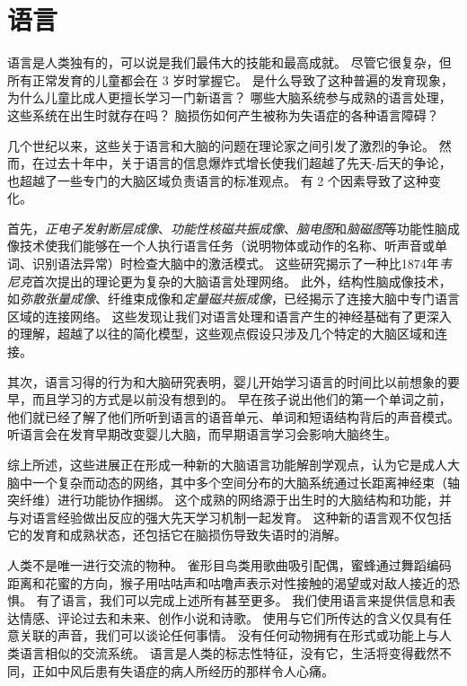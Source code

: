 \chapter{语言} \label{chap:chap55}

语言是人类独有的，可以说是我们最伟大的技能和最高成就。
尽管它很复杂，但所有正常发育的儿童都会在 3 岁时掌握它。
是什么导致了这种普遍的发育现象，为什么儿童比成人更擅长学习一门新语言？
哪些大脑系统参与成熟的语言处理，这些系统在出生时就存在吗？
脑损伤如何产生被称为失语症的各种语言障碍？


几个世纪以来，这些关于语言和大脑的问题在理论家之间引发了激烈的争论。
然而，在过去十年中，关于语言的信息爆炸式增长使我们超越了先天-后天的争论，也超越了一些专门的大脑区域负责语言的标准观点。
有 2 个因素导致了这种变化。


首先，\textit{正电子发射断层成像}、\textit{功能性核磁共振成像}、\textit{脑电图}和\textit{脑磁图}等功能性脑成像技术使我们能够在一个人执行语言任务（说明物体或动作的名称、听声音或单词、识别语法异常）时检查大脑中的激活模式。
这些研究揭示了一种比1874年\textit{韦尼克}首次提出的理论更为复杂的大脑语言处理网络。
此外，结构性脑成像技术，如\textit{弥散张量成像}、纤维束成像和\textit{定量磁共振成像}，已经揭示了连接大脑中专门语言区域的连接网络。
这些发现让我们对语言处理和语言产生的神经基础有了更深入的理解，超越了以往的简化模型，这些观点假设只涉及几个特定的大脑区域和连接。


其次，语言习得的行为和大脑研究表明，婴儿开始学习语言的时间比以前想象的要早，而且学习的方式是以前没有想到的。
早在孩子说出他们的第一个单词之前，他们就已经了解了他们所听到语言的语音单元、单词和短语结构背后的声音模式。
听语言会在发育早期改变婴儿大脑，而早期语言学习会影响大脑终生。


综上所述，这些进展正在形成一种新的大脑语言功能解剖学观点，认为它是成人大脑中一个复杂而动态的网络，其中多个空间分布的大脑系统通过长距离神经束（轴突纤维）进行功能协作捆绑。
这个成熟的网络源于出生时的大脑结构和功能，并与对语言经验做出反应的强大先天学习机制一起发育。
这种新的语言观不仅包括它的发育和成熟状态，还包括它在脑损伤导致失语时的消解。


人类不是唯一进行交流的物种。
雀形目鸟类用歌曲吸引配偶，蜜蜂通过舞蹈编码距离和花蜜的方向，猴子用咕咕声和咕噜声表示对性接触的渴望或对敌人接近的恐惧。
有了语言，我们可以完成上述所有甚至更多。
我们使用语言来提供信息和表达情感、评论过去和未来、创作小说和诗歌。
使用与它们所传达的含义仅具有任意关联的声音，我们可以谈论任何事情。
没有任何动物拥有在形式或功能上与人类语言相似的交流系统。
语言是人类的标志性特征，没有它，生活将变得截然不同，正如中风后患有失语症的病人所经历的那样令人心痛。



